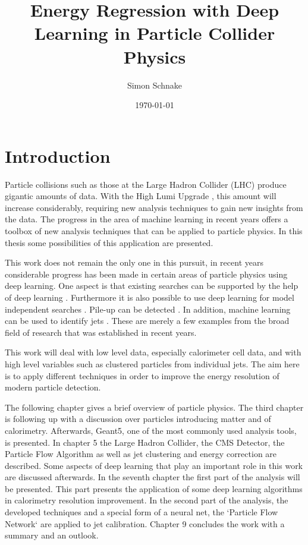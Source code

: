 \documentclass[12pt, a4paper]{thesis}
\author{Simon Schnake}
\date{\today}
\title{Energy Regression with Deep Learning in Particle Collider Physics}
\begin{document}


\tableofcontents
\cleardoublepage

\chapter{Introduction}
\label{sec:org1373fac}

Particle collisions such as those at the Large Hadron Collider (LHC)
\cite{lhc_machine} produce gigantic amounts of data. With the High
Lumi Upgrade \cite{bruening19_high_lumin_large_hadron_collid}, this
amount will increase considerably, requiring new analysis
techniques to gain new insights from the data. The progress in the
area of machine learning in recent years offers a toolbox of new
analysis techniques that can be applied to particle physics. In this
thesis some possibilities of this application are presented.

This work does not remain the only one in this pursuit, in recent
years considerable progress has been made in certain areas of particle
physics using deep learning. One aspect is that existing searches can
be supported by the help of deep learning
\cite{baldi14_searc_exotic_partic_high_energ,baldi15_enhan_higgs_boson_to_with_deep_learn,santos17_machin_learn_techn_searc_decay_chann}.
Furthermore it is also possible to use deep learning for model
independent searches
\cite{dagnolo19_learn_new_physic_from_machin,simone19_guidin_new_physic_searc_with_unsup_learn,heimel19_qcd_or_what}.
Pile-up can be detected
\cite{komiske17_pileup_mitig_with_machin_learn_pumml}.  In addition,
machine learning can be used to identify jets
\cite{komiske19_energ_flow_networ,cogan15_jet_images,oliveira16_jet_images_deep_learn_edition,baldi16_jet_subst_class_high_energ,barnard17_parton_shower_uncer_jet_subst,kasieczka17_deep_learn_top_tagger_or_end_qcd,datta17_how_much_infor_is_jet,komiske17_deep_learn_color}.
These are merely a few examples from the broad field of research that
was established in recent years.

This work will deal with low level data, especially calorimeter cell
data, and with high level variables such as clustered particles from
individual jets.  The aim here is to apply different techniques in
order to improve the energy resolution of modern particle detection.

The following chapter gives a brief overview of particle physics. The
third chapter is following up with a discussion over particles
introducing matter and of calorimetry. Afterwards, Geant5, one of the
most commonly used analysis tools, is presented. In chapter 5 the
Large Hadron Collider, the CMS Detector, the Particle Flow Algorithm
as well as jet clustering and energy correction are described. Some
aspects of deep learning that play an important role in this work are
discussed afterwards. In the seventh chapter the first part of the
analysis will be presented. This part presents the application of some
deep learning algorithms in calorimetry resolution improvement. In the
second part of the analysis, the developed techniques and a special
form of a neural net, the `Particle Flow Network` are applied to jet
calibration. Chapter 9 concludes the work with a summary and an
outlook.
\end{document}
